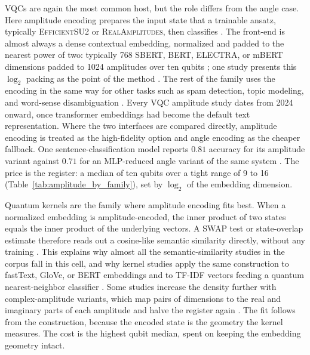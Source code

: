 \documentclass{ieeeaccess}
\begin{document}
VQCs are again the most common host, but the role differs from the angle case. Here amplitude encoding prepares the input state that a trainable ansatz, typically \textsc{EfficientSU2} or \textsc{RealAmplitudes}, then classifies \cite{korrapati_quantum_2025}.
The front-end is almost always a dense contextual embedding, normalized and padded to the nearest power of two: typically 768 SBERT, BERT, ELECTRA, or mBERT dimensions padded to 1024 amplitudes over ten qubits \cite{guarasci_applying_2025,buonaiuto_quantum_2024,buonaiuto_multilingual_2025}; one study presents this $\log_2$ packing as the point of the method \cite{liu_hcqnsc_2026}. The rest of the family uses the encoding in the same way for other tasks such as spam detection, topic modeling, and word-sense disambiguation \cite{amsaveni_qesan_2025,buonaiuto_quantum_2024-1,pandey_quantum_2024,qiao_quantum_2024,shahriyar_toward_2025,isea_using_2026}. Every VQC amplitude study dates from 2024 onward, once transformer embeddings had become the default text representation.
Where the two interfaces are compared directly, amplitude encoding is treated as the high-fidelity option and angle encoding as the cheaper fallback. One sentence-classification model reports $0.81$ accuracy for its amplitude variant against $0.71$ for an MLP-reduced angle variant of the same system \cite{guarasci_applying_2025}. The price is the register: a median of ten qubits over a tight range of 9 to 16 (Table~\ref{tab:amplitude_by_family}), set by $\log_2$ of the embedding dimension.

Quantum kernels are the family where amplitude encoding fits best. When a normalized embedding is amplitude-encoded, the inner product of two states equals the inner product of the underlying vectors. A SWAP test or state-overlap estimate therefore reads out a cosine-like semantic similarity directly, without any training \cite{cavar_old_2026,cavar_word_2025,cavar_semantic_2024}.
This explains why almost all the semantic-similarity studies in the corpus fall in this cell, and why kernel studies apply the same construction to fastText, GloVe, or BERT embeddings and to TF-IDF vectors feeding a quantum nearest-neighbor classifier \cite{alexander_quantum_2022,zeguendry_quantum_2024}. Some studies increase the density further with complex-amplitude variants, which map pairs of dimensions to the real and imaginary parts of each amplitude and halve the register again \cite{cavar_old_2026}.
The fit follows from the construction, because the encoded state is the geometry the kernel measures. The cost is the highest qubit median, spent on keeping the embedding geometry intact.
\end{document}
